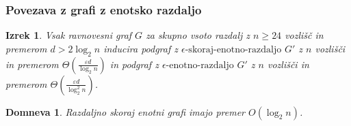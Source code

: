 \documentclass[12pt, hyperref={unicode}]{beamer}
\newtheorem{izrek}{Izrek}
\newtheorem{domneva}{Domneva}
\begin{document}
\begin{frame}

  \frametitle{Povezava z grafi z enotsko razdaljo}
  \begin{izrek}
    Vsak ravnovesni graf $G$ za skupno vsoto razdalj z $n \geq 24$ vozlišč in
    premerom $d > 2 \log_2 n$ inducira podgraf z $\epsilon\text{-skoraj-enotno-razdaljo } G'$
    z $n$ vozlišči in premerom $\Theta\left(\frac{\varepsilon d}{\log_2 n}\right)$ in
    podgraf z $\epsilon\text{-enotno-razdaljo } G'$ z $n$ vozlišči in premerom
    $\Theta\left(\frac{\varepsilon d}{\log_2^2 n}\right)$.
  \end{izrek}

  \begin{domneva}
    Razdaljno skoraj enotni grafi imajo premer $O(\log_2 n)$.
  \end{domneva}


\end{frame}
\end{document}
